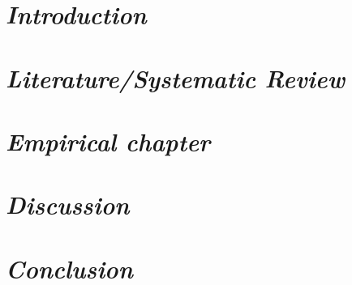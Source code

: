 \documentclass[12pt, english]{report}
\begin{document}
\setlength{\cftbeforetoctitleskip}{-22pt}
\setlength{\cftaftertoctitleskip}{-22pt}
\renewcommand{\contentsname}{\huge\textbf{Table of Contents}}
\renewcommand{\cfttoctitlefont}{\chapter*}

\tableofcontents

\clearpage

\setlength{\cftbeforeloftitleskip}{-22pt}
\renewcommand{\cftloftitlefont}{\hfill\huge\bfseries}
\renewcommand{\cftafterloftitle}{\hfill}
\listoffigures

\clearpage

\setlength{\cftbeforelottitleskip}{-22pt}
\renewcommand{\cftlottitlefont}{\hfill\huge\bfseries}
\renewcommand{\cftafterlottitle}{\hfill}
\listoftables


\cleardoublepage

\chapter{\textsl{Introduction}}

%

\chapter{\textsl{Literature/Systematic Review}}

%

\chapter{\textsl{Empirical chapter}}

%


\chapter{\textsl{Discussion}}

%

\chapter{\textsl{Conclusion}}

%

\newpage


\end{document}
